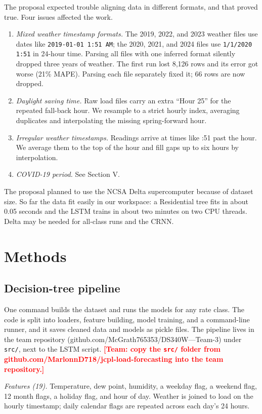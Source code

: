 \documentclass[10pt,letterpaper,twocolumn]{article}
\newcommand{\todo}[1]{\textcolor{red}{\textbf{[Team: #1]}}}
\newcommand{\code}[1]{\texttt{#1}}
\begin{document}
The proposal expected trouble aligning data in different formats, and that proved true. Four issues affected the work.
\begin{enumerate}[leftmargin=1.6em]
\item \textit{Mixed weather timestamp formats.} The 2019, 2022, and 2023 weather files use dates like \code{2019-01-01 1:51 AM}; the 2020, 2021, and 2024 files use \code{1/1/2020 1:51} in 24-hour time. Parsing all files with one inferred format silently dropped three years of weather. The first run lost 8,126 rows and its error got worse (21\% MAPE). Parsing each file separately fixed it; 66 rows are now dropped.
\item \textit{Daylight saving time.} Raw load files carry an extra ``Hour 25'' for the repeated fall-back hour. We resample to a strict hourly index, averaging duplicates and interpolating the missing spring-forward hour.
\item \textit{Irregular weather timestamps.} Readings arrive at times like :51 past the hour. We average them to the top of the hour and fill gaps up to six hours by interpolation.
\item \textit{COVID-19 period.} See Section V.
\end{enumerate}
The proposal planned to use the NCSA Delta supercomputer because of dataset size. So far the data fit easily in our workspace: a Residential tree fits in about 0.05 seconds and the LSTM trains in about two minutes on two CPU threads. Delta may be needed for all-class runs and the CRNN.

\section{Methods}
\subsection{Decision-tree pipeline}
One command builds the dataset and runs the models for any rate class. The code is split into loaders, feature building, model training, and a command-line runner, and it saves cleaned data and models as pickle files. The pipeline lives in the team repository (github.com/McGrath765353/DS340W---Team-3) under \code{src/}, next to the LSTM script. \todo{copy the \code{src/} folder from github.com/MarlonnD718/jcpl-load-forecasting into the team repository.}

\textit{Features (19).} Temperature, dew point, humidity, a weekday flag, a weekend flag, 12 month flags, a holiday flag, and hour of day. Weather is joined to load on the hourly timestamp; daily calendar flags are repeated across each day's 24 hours.
\end{document}
